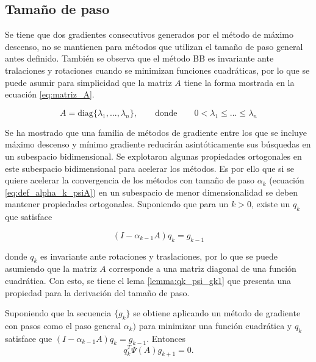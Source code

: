 \subsection*{Tamaño de paso}


Se tiene que dos gradientes consecutivos generados por el método de máximo descenso, no se mantienen para métodos que utilizan el tamaño de paso general antes definido. También se observa que el método BB es invariante ante tralaciones y rotaciones cuando se minimizan funciones cuadráticas\cite{dai_2005}, por lo que se puede asumir para simplicidad que la matriz $A$ tiene la forma mostrada en la ecuación \ref{eq:matriz_A}.

\begin{equation}
	A = \text{diag}\{\lambda_1, ..., \lambda_n\}, \qquad \text{donde} \qquad 0<\lambda_1\leq...\leq\lambda_n \label{eq:matriz_A}
\end{equation}


Se ha mostrado que una familia de métodos de gradiente entre los que se incluye máximo descenso y mínimo gradiente reducirán asintóticamente sus búsquedas en un subespacio bidimensional. Se explotaron algunas propiedades ortogonales en este subespacio bidimensional para acelerar los métodos\cite{huang_2022}. %
Es por ello que si se quiere acelerar la convergencia de los métodos con tamaño de paso $\alpha_k$ (ecuación \ref{eq:def_alpha_k_psiA}) en un subespacio de menor dimensionalidad se deben mantener propiedades ortogonales. Suponiendo que para un $k>0$, existe un $q_k$ que satisface

\begin{equation*}
	(I-\alpha_{k-1}A)q_k = g_{k-1}
\end{equation*}

donde $q_k$ es invariante ante rotaciones y traslaciones, por lo que se puede asumiendo que la matriz $A$ corresponde a una matriz diagonal de una función cuadrática. Con esto, se tiene el lema \ref{lemma:qk_psi_gk1} que presenta una propiedad para la derivación del tamaño de paso.

\begin{lema}
	Suponiendo que la secuencia $\{g_k\}$ se obtiene aplicando un método de gradiente con pasos como el paso general $\alpha_k)$ para minimizar una función cuadrática y $q_k$ satisface que $(I-\alpha_{k-1}A)q_k = g_{k-1}$. Entonces
	\begin{equation*}
		q_k^T\Psi(A)g_{k+1} = 0.
	\end{equation*}
	\label{lemma:qk_psi_gk1}
\end{lema}

